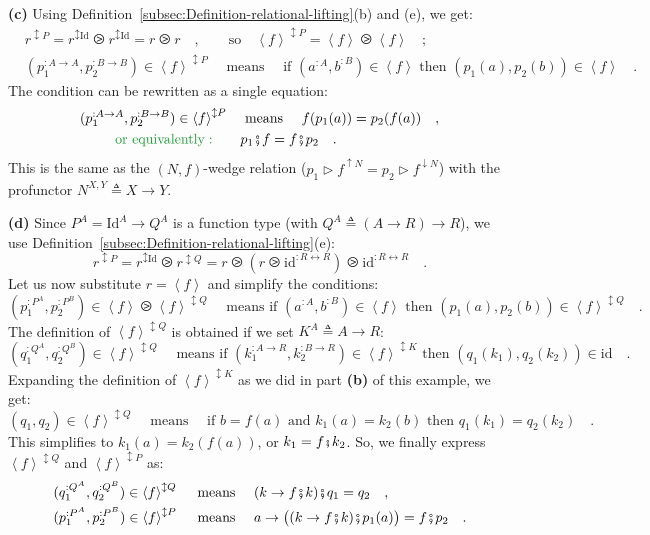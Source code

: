 \textbf{(c)} Using Definition~\ref{subsec:Definition-relational-lifting}(b)
and (e), we get:
\begin{align*}
 & r^{\updownarrow P}=r^{\updownarrow\text{Id}}\ogreaterthan r^{\updownarrow\text{Id}}=r\ogreaterthan r\quad,\quad\quad\text{so}\quad\left<f\right>^{\updownarrow P}=\left<f\right>\ogreaterthan\left<f\right>\quad;\\
 & (p_{1}^{:A\rightarrow A},p_{2}^{:B\rightarrow B})\in\left<f\right>^{\updownarrow P}\quad\text{ means }\quad\text{if }(a^{:A},b^{:B})\in\left<f\right>\text{ then }(p_{1}(a),p_{2}(b))\in\left<f\right>\quad.
\end{align*}
The condition can be rewritten as a single equation:
\begin{align*}
(p_{1}^{:A\rightarrow A},p_{2}^{:B\rightarrow B})\in\left<f\right>^{\updownarrow P} & \quad\text{ means }\quad f(p_{1}(a))=p_{2}(f(a))\quad,\\
{\color{greenunder}\text{or equivalently}:}\quad & \quad p_{1}\bef f=f\bef p_{2}\quad.
\end{align*}
This is the same as the $\left(N,f\right)$-wedge relation ($p_{1}\triangleright f^{\uparrow N}=p_{2}\triangleright f^{\downarrow N}$)
with the profunctor $N^{X,Y}\triangleq X\rightarrow Y$.

\textbf{(d)} Since $P^{A}=\text{Id}^{A}\rightarrow Q^{A}$ is a function
type (with $Q^{A}\triangleq\left(A\rightarrow R\right)\rightarrow R$),
we use Definition~\ref{subsec:Definition-relational-lifting}(e):
\[
r^{\updownarrow P}=r^{\updownarrow\text{Id}}\ogreaterthan r^{\updownarrow Q}=r\ogreaterthan(r\ogreaterthan\text{id}^{:R\leftrightarrow R})\ogreaterthan\text{id}^{:R\leftrightarrow R}\quad.
\]
Let us now substitute $r=\left<f\right>$ and simplify the conditions:
\[
(p_{1}^{:P^{A}},p_{2}^{:P^{B}})\in\left<f\right>\ogreaterthan\left<f\right>^{\updownarrow Q}\quad\text{ means }\text{if }(a^{:A},b^{:B})\in\left<f\right>\text{ then }(p_{1}(a),p_{2}(b))\in\left<f\right>^{\updownarrow Q}\quad.
\]
The definition of $\left<f\right>^{\updownarrow Q}$ is obtained if
we set $K^{A}\triangleq A\rightarrow R$:
\[
(q_{1}^{:Q^{A}},q_{2}^{:Q^{B}})\in\left<f\right>^{\updownarrow Q}\quad\text{ means }\text{if }(k_{1}^{:A\rightarrow R},k_{2}^{:B\rightarrow R})\in\left<f\right>^{\updownarrow K}\text{ then }(q_{1}(k_{1}),q_{2}(k_{2}))\in\text{id}\quad.
\]
Expanding the definition of $\left<f\right>^{\updownarrow K}$ as
we did in part \textbf{(b)} of this example, we get:
\[
(q_{1},q_{2})\in\left<f\right>^{\updownarrow Q}\quad\text{ means }\quad\text{if }b=f(a)\text{ and }k_{1}(a)=k_{2}(b)\text{ then }q_{1}(k_{1})=q_{2}(k_{2})\quad.
\]
This simplifies to $k_{1}(a)=k_{2}(f(a))$, or $k_{1}=f\bef k_{2}$.
So, we finally express $\left<f\right>^{\updownarrow Q}$ and $\left<f\right>^{\updownarrow P}$
as:
\begin{align*}
 & (q_{1}^{:Q^{A}},q_{2}^{:Q^{B}})\in\left<f\right>^{\updownarrow Q}\quad\text{ means }\quad(k\rightarrow f\bef k)\bef q_{1}=q_{2}\quad,\\
 & (p_{1}^{:P^{A}},p_{2}^{:P^{B}})\in\left<f\right>^{\updownarrow P}\quad\text{ means }\quad a\rightarrow\big((k\rightarrow f\bef k)\bef p_{1}(a)\big)=f\bef p_{2}\quad.
\end{align*}

